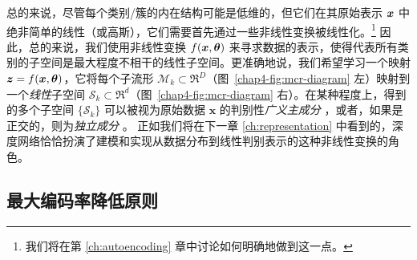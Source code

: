 \documentclass[../../book-main.tex]{subfiles}
\begin{document}
总的来说，尽管每个类别/簇的内在结构可能是低维的，但它们在其原始表示 $\bm{x}$ 中绝非简单的线性（或高斯），它们需要首先通过一些非线性变换被线性化。\footnote{我们将在第 \ref{ch:autoencoding} 章中讨论如何明确地做到这一点。} 因此，总的来说，我们使用非线性变换 $f(\bm{x},\bm\theta)$ 来寻求数据的表示，使得代表所有类别的子空间是最大程度不相干的线性子空间。更准确地说，我们希望学习一个映射 {$\bm{z} = f(\bm{x},\bm\theta)$}，它将每个子流形 $\mathcal{M}_k \subset \Re^D$（图~\ref{chap4-fig:mcr-diagram} 左）映射到一个{\em 线性}子空间 $\mathcal{S}_k \subset \Re^d$（图~\ref{chap4-fig:mcr-diagram} 右）。在某种程度上，得到的多个子空间 $\{\mathcal{S}_k\}$ 可以被视为原始数据 $\bm x$ 的判别性{\em 广义主成分} \cite{GPCA}，或者，如果是正交的，则为{\em 独立成分} \cite{hyvarinen2000independent}。
正如我们将在下一章 \ref{ch:representation} 中看到的，深度网络恰恰扮演了建模和实现从数据分布到线性判别表示的这种非线性变换的角色。


\subsection{最大编码率降低原则}\label{subsec:MCR2}



\end{document}
